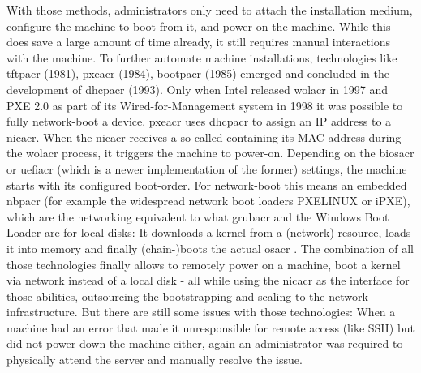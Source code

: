 \newline
With those methods, administrators only need to attach the installation medium, configure the machine to boot from it, and power on the machine. While this does save a large amount of time already, it still requires manual interactions with the machine.
\newline
To further automate machine installations, technologies like \gls{tftpacr} (1981), \gls{pxeacr} (1984), \gls{bootpacr} (1985) emerged and concluded in the development of \gls{dhcpacr} (1993). Only when Intel released \gls{wolacr} in 1997 and PXE 2.0 as part of its Wired-for-Management system in 1998 it was possible to fully network-boot a device.
\newline
\Gls{pxeacr} uses \gls{dhcpacr} to assign an IP address to a \gls{nicacr}. When the \gls{nicacr} receives a so-called  containing its MAC address during the \gls{wolacr} process, it triggers the machine to power-on. Depending on the \gls{biosacr} or \gls{uefiacr} (which is a newer implementation of the former) settings, the machine starts with its configured boot-order. For network-boot this means an embedded \gls{nbpacr} (for example the widespread network boot loaders PXELINUX or iPXE), which are the networking equivalent to what \gls{grubacr} and the Windows Boot Loader are for local disks: It downloads a kernel from a (network) resource, loads it into memory and finally (chain-)boots the actual \gls{osacr} \cite{preboot_execution_environment} \cite{understanding_bare_metal_service}.
\newline
The combination of all those technologies finally allows to remotely power on a machine, boot a kernel via network instead of a local disk - all while using the \gls{nicacr} as the interface for those abilities, outsourcing the bootstrapping and scaling to the network infrastructure.
\newline
But there are still some issues with those technologies:
\newline
When a machine had an error that made it unresponsible for remote access (like SSH) but did not power down the machine either, again an administrator was required to physically attend the server and manually resolve the issue.
\newline
